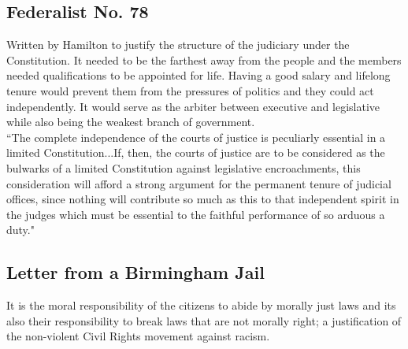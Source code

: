 \documentclass[12pt]{article}
\begin{document}
\subsection*{Federalist No. 78}
	Written by Hamilton to justify the structure of the judiciary under the Constitution. It needed to be the farthest away from the people and the members needed qualifications to be appointed for life. Having a good salary and lifelong tenure would prevent them from the pressures of politics and they could act independently. It would serve as the arbiter between executive and legislative while also being the weakest branch of government.\\
``The complete independence of the courts of justice is peculiarly essential in a limited Constitution...If, then, the courts of justice are to be considered as the bulwarks of a limited Constitution against legislative encroachments, this consideration will afford a strong argument for the permanent tenure of judicial offices, since nothing will contribute so much as this to that independent spirit in the judges which must be essential to the faithful performance of so arduous a duty."\\
\subsection*{Letter from a Birmingham Jail}
	It is the moral responsibility of the citizens to abide by morally just laws and its also their responsibility to break laws that are not morally right; a justification of the non-violent Civil Rights movement against racism.\\
\end{document}
